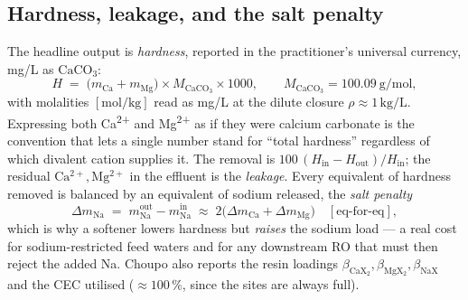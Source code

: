 \documentclass[11pt,a4paper]{article}
\begin{document}
\subsection{Hardness, leakage, and the salt penalty}

The headline output is \emph{hardness}, reported in the practitioner's
universal currency, mg/L as $\mathrm{CaCO_3}$:
\begin{equation}
   H \;=\; \big(m_{\mathrm{Ca}} + m_{\mathrm{Mg}}\big)\times
   M_{\mathrm{CaCO_3}}\times 1000,
   \qquad M_{\mathrm{CaCO_3}}=100.09\ \mathrm{g/mol},
   \label{eq:hardness}
\end{equation}
with molalities $[\mathrm{mol/kg}]$ read as mg/L at the dilute closure
$\rho\approx 1\,\mathrm{kg/L}$.  Expressing both
Ca\textsuperscript{2+} and Mg\textsuperscript{2+} as if they were
calcium carbonate is the convention that lets a single number stand for
``total hardness'' regardless of which divalent cation supplies it.
The removal is $100\,(H_{\text{in}}-H_{\text{out}})/H_{\text{in}}$;
the residual $\mathrm{Ca^{2+}}, \mathrm{Mg^{2+}}$ in the effluent is the
\emph{leakage}.  Every equivalent of hardness removed is balanced by an
equivalent of sodium released, the \emph{salt penalty}
\begin{equation}
   \Delta m_{\mathrm{Na}}
   \;=\; m_{\mathrm{Na}}^{\text{out}} - m_{\mathrm{Na}}^{\text{in}}
   \;\approx\; 2\big(\Delta m_{\mathrm{Ca}}+\Delta m_{\mathrm{Mg}}\big)
   \quad[\text{eq-for-eq}],
   \label{eq:salt-penalty}
\end{equation}
which is why a softener lowers hardness but \emph{raises} the sodium
load --- a real cost for sodium-restricted feed waters and for any
downstream RO that must then reject the added Na.  Choupo also reports
the resin loadings $\beta_{\mathrm{CaX_2}}, \beta_{\mathrm{MgX_2}},
\beta_{\mathrm{NaX}}$ and the CEC utilised ($\approx 100\,\%$, since the
sites are always full).
\end{document}
